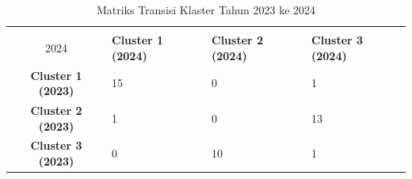 \begin{table}[H]
\centering
\caption{Matriks Transisi Klaster Tahun 2023 ke 2024} \label{tab:transisi_2023_2024}
\begin{tabular}{|c|p{2cm}|p{2cm}|p{2cm}|}
\hline
\textbf{Tahun 2023 \\ 2024} & \textbf{Cluster 1 (2024)} & \textbf{Cluster 2 (2024)} & \textbf{Cluster 3 (2024)} \\ \hline
\textbf{Cluster 1 (2023)} & 15 & 0 & 1 \\ \hline
\textbf{Cluster 2 (2023)} & 1 & 0 & 13 \\ \hline
\textbf{Cluster 3 (2023)} & 0 & 10 & 1 \\ \hline
\end{tabular}
\end{table}